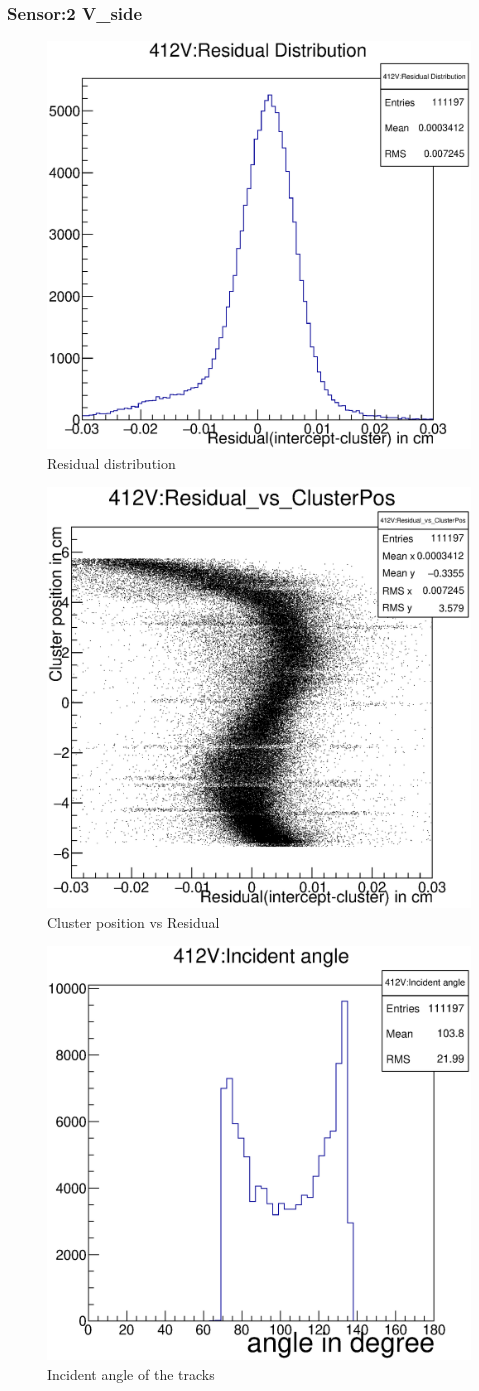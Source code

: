 \documentclass[12pt]{article}
\begin{document}
		\subsubsection{Sensor:2 V\_side}
		\begin{multicols}{3}
			\begin{figure}[H]
				\includegraphics[width=.3\textwidth]{412V:residualplot.eps}	
				\caption{Residual distribution}	
				\label{fig1}	
			\end{figure}
			\begin{figure}[H]
				\includegraphics[width=.3\textwidth]{412V:residual_vs_clusterpos.eps}	
				\caption{Cluster position vs Residual}	
				\label{fig2}	
			\end{figure}
			\begin{figure}[H]
				\includegraphics[width=.3\textwidth]{412V:incident_angle.eps}	
				\caption{Incident angle of the tracks}	
				\label{fig2}	
			\end{figure}
		\end{multicols}
		
\end{document}
